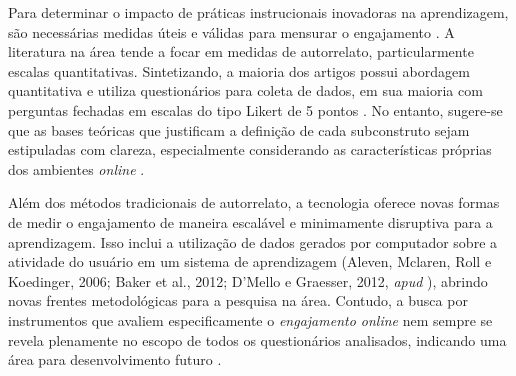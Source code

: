 Para determinar o impacto de práticas instrucionais inovadoras na aprendizagem, são necessárias medidas úteis e válidas para mensurar o engajamento \cite{henrieMeasuringStudentEngagement2015}. A literatura na área tende a focar em medidas de autorrelato, particularmente escalas quantitativas. Sintetizando, a maioria dos artigos possui abordagem quantitativa e utiliza questionários para coleta de dados, em sua maioria com perguntas fechadas em escalas do tipo Likert de 5 pontos \cite{ortegaMensuracaoEngajamentoOnline2022}. No entanto, sugere-se que as bases teóricas que justificam a definição de cada subconstruto sejam estipuladas com clareza, especialmente considerando as características próprias dos ambientes \textit{online} \cite{ortegaMensuracaoEngajamentoOnline2022}.

Além dos métodos tradicionais de autorrelato, a tecnologia oferece novas formas de medir o engajamento de maneira escalável e minimamente disruptiva para a aprendizagem. Isso inclui a utilização de dados gerados por computador sobre a atividade do usuário em um sistema de aprendizagem (Aleven, Mclaren, Roll e Koedinger, 2006; Baker et al., 2012; D'Mello e Graesser, 2012, \textit{apud} \cite{henrieMeasuringStudentEngagement2015}), abrindo novas frentes metodológicas para a pesquisa na área. Contudo, a busca por instrumentos que avaliem especificamente o \textit{engajamento online} nem sempre se revela plenamente no escopo de todos os questionários analisados, indicando uma área para desenvolvimento futuro \cite{ortegaMensuracaoEngajamentoOnline2022}.